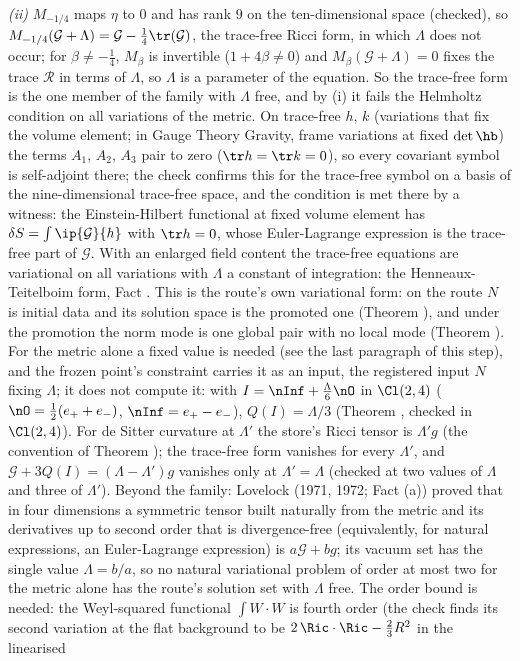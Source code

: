 \emph{(ii)} $M_{-1/4}$ maps $\eta$ to $0$ and has rank $9$ on the ten-dimensional space (checked), so $M_{-1/4}(\mathcal{G} + \Lambda) = \mathcal{G} - \tfrac14\tr(\mathcal{G})$, the trace-free Ricci form, in which $\Lambda$ does not occur; for $\beta \neq -\tfrac14$, $M_{\beta}$ is invertible ($1 + 4\beta \neq 0$) and $M_{\beta}(\mathcal{G} + \Lambda) = 0$ fixes the trace $\mathcal{R}$ in terms of $\Lambda$, so $\Lambda$ is a parameter of the equation. So the trace-free form is the one member of the family with $\Lambda$ free, and by (i) it fails the Helmholtz condition on all variations of the metric. On trace-free $h$, $k$ (variations that fix the volume element; in Gauge Theory Gravity, frame variations at fixed $\det\hb$) the terms $A_{1}$, $A_{2}$, $A_{3}$ pair to zero ($\tr h = \tr k = 0$), so every covariant symbol is self-adjoint there; the check confirms this for the trace-free symbol on a basis of the nine-dimensional trace-free space, and the condition is met there by a witness: the Einstein-Hilbert functional at fixed volume element has $\delta S = \int\ip{\mathcal{G}}{h}$ with $\tr h = 0$, whose Euler-Lagrange expression is the trace-free part of $\mathcal{G}$. With an enlarged field content the trace-free equations are variational on all variations with $\Lambda$ a constant of integration: the Henneaux-Teitelboim form, Fact . This is the route's own variational form: on the route $N$ is initial data and its solution space is the promoted one (Theorem ), and under the promotion the norm mode is one global pair with no local mode (Theorem ). For the metric alone a fixed value is needed (see the last paragraph of this step), and the frozen point's constraint carries it as an input, the registered input $N$ fixing $\Lambda$; it does not compute it: with $I = \nInf + \tfrac{\Lambda}{6}\nO$ in $\Cl(2,4)$ ($\nO = \tfrac12(e_{+} + e_{-})$, $\nInf = e_{+} - e_{-}$), $Q(I) = \Lambda/3$ (Theorem , checked in $\Cl(2,4)$). For de Sitter curvature at $\Lambda'$ the store's Ricci tensor is $\Lambda' g$ (the convention of Theorem ); the trace-free form vanishes for every $\Lambda'$, and $\mathcal{G} + 3Q(I) = (\Lambda - \Lambda')g$ vanishes only at $\Lambda' = \Lambda$ (checked at two values of $\Lambda$ and three of $\Lambda'$). Beyond the family: Lovelock (1971, 1972; Fact (a)) proved that in four dimensions a symmetric tensor built naturally from the metric and its derivatives up to second order that is divergence-free (equivalently, for natural expressions, an Euler-Lagrange expression) is $a\mathcal{G} + bg$; its vacuum set has the single value $\Lambda = b/a$, so no natural variational problem of order at most two for the metric alone has the route's solution set with $\Lambda$ free. The order bound is needed: the Weyl-squared functional $\int W\cdot W$ is fourth order (the check finds its second variation at the flat background to be $2\,\Ric\cdot\Ric - \tfrac23 R^{2}$ in the linearised 